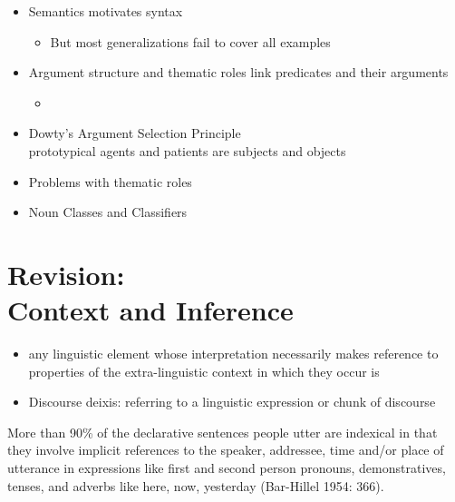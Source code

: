 \documentclass[headrule,footrule]{foils}
\begin{document}
\MyLogo{}
\begin{itemize}
\item  Semantics motivates syntax
  \begin{itemize}
  \item  But most generalizations fail to cover all examples
  \end{itemize}
\item Argument structure and thematic roles link predicates and their arguments
  \begin{itemize}
  \item {}
  \end{itemize}
\item Dowty's Argument Selection Principle
  \\ prototypical agents and patients are subjects and objects 
\item Problems with thematic roles
\item Noun Classes and Classifiers
\end{itemize}

\section{Revision: \\ Context and Inference}



\begin{itemize}
\item any linguistic element whose interpretation
  necessarily makes reference to properties of the
  extra-linguistic context in which they occur is 
\item Discourse deixis: referring to a linguistic expression or chunk of discourse
\end{itemize}

More than 90\% of the declarative sentences people utter are indexical
in that they involve implicit references to the speaker, addressee,
time and/or place of utterance in expressions like first and second
person pronouns, demonstratives, tenses, and adverbs like here, now,
yesterday (Bar-Hillel 1954: 366).
\end{document}
